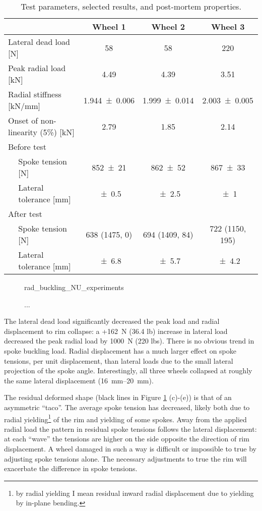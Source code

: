 \documentclass[\rootdir/thesis.tex]{subfiles}
\begin{document}
\begin{table}
\caption{Test parameters, selected results, and post-mortem properties.}
\label{tab:rad_buckling_tests}
\begin{tabular}{llccc}
\hline
&& \bf Wheel 1 & \bf Wheel 2 & \bf Wheel 3\\
\hline
\multicolumn{2}{l}{Lateral dead load [\si{N}]} & \num{58} & \num{58} & \num{220}\\
\multicolumn{2}{l}{Peak radial load [\si{kN}]} & \num{4.49} & \num{4.39} & \num{3.51}\\
\multicolumn{2}{l}{Radial stiffness [\si{kN/mm}]} & \num{1.944+-0.006} & \num{1.999+-0.014} & \num{2.003+-0.005}\\
\multicolumn{2}{l}{Onset of non-linearity (5\%) [\si{kN}]} & \num{2.79} & \num{1.85} & \num{2.14}\\
\multicolumn{5}{l}{Before test}\\
\,& Spoke tension [\si{N}]      & \num{852+-21} & \num{862+-52} & \num{867+-33}\\
\,& Lateral tolerance [\si{mm}] & \num{+-0.5} & \num{+-2.5} & \num{+-1}\\

\multicolumn{5}{l}{After test}\\
\,& Spoke tension [\si{N}]      & 638 (1475, 0) & 694 (1409, 84) & 722 (1150, 195)\\
\,& Lateral tolerance [\si{mm}] & \num{+-6.8} & \num{+-5.7} & \num{+-4.2}\\
\hline
\end{tabular}
\end{table}

\begin{figure}[h]
\centering
{rad_buckling_NU_experiments}
\caption{...}
\label{fig:rad_buckling_NU_experiments}
\end{figure}

The lateral dead load significantly decreased the peak load and radial displacement to rim collapse: a +\SI{162}{N} (\num{36.4} lb) increase in lateral load decreased the peak radial load by \SI{1000}{N} (\num{220} lbs). There is no obvious trend in spoke buckling load. Radial displacement has a much larger effect on spoke tensions, per unit displacement, than lateral loads due to the small lateral projection of the spoke angle. Interestingly, all three wheels collapsed at roughly the same lateral displacement (\SIrange{16}{20}{mm}).

The residual deformed shape (black lines in Figure \ref{fig:rad_buckling_NU_experiments} (c)-(e)) is that of an asymmetric ``taco''. The average spoke tension has decreased, likely both due to radial yielding\footnote{by radial yielding I mean residual inward radial displacement due to yielding by in-plane bending.} of the rim and yielding of some spokes. Away from the applied radial load the pattern in residual spoke tensions follows the lateral displacement: at each ``wave'' the tensions are higher on the side opposite the direction of rim displacement. A wheel damaged in such a way is difficult or impossible to true by adjusting spoke tensions alone. The necessary adjustments to true the rim will exacerbate the difference in spoke tensions.
\end{document}
